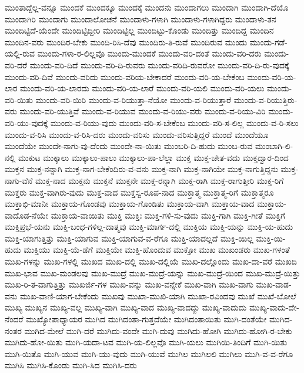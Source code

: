 {ಮುಂತಾದ್ದೆಲ್ಲ-ವನ್ನೂ
ಮುಂದಕೆ
ಮುಂದಕ್ಕೂ
ಮುಂದಕ್ಕೆ
ಮುಂದನು
ಮುಂದಾಗಲು
ಮುಂದಾಗಿ
ಮುಂದಾಗಿ-ದೆಯೊ
ಮುಂದಾಗಿರಿ
ಮುಂದಾಗು
ಮುಂದಾಲೋಚನೆ
ಮುಂದಾಳು-ಗಳಾಗಿ
ಮುಂದಾಳು-ಗಳಾಗಿದ್ದರು
ಮುಂದಾಳು-ತನ
ಮುಂದಿಟ್ಟಿದೆ-ಯೆಂದೇ
ಮುಂದಿಟ್ಟಿದ್ದೀರಿ
ಮುಂದಿಟ್ಟಿಲ್ಲ
ಮುಂದಿಟ್ಟು-ಕೊಂಡು
ಮುಂದಿತ್ತು
ಮುಂದಿದ್ದ
ಮುಂದಿನ
ಮುಂದಿನ-ವರು
ಮುಂದಿರ-ಬೇಕು
ಮುಂದಿ-ರಿಸಿ-ದೆವು
ಮುಂದಿರು-ತಿ-ರುವೆ
ಮುಂದಿರುವ
ಮುಂದು
ಮುಂದು-ಗಡೆ-ಯಲ್ಲಿ-ರುವ
ಮುಂದು-ಗಳಾ-ರ-ಲಿಲ್ಲವೊ
ಮುಂದು-ಮುಂದಕೆ
ಮುಂದು-ವರಿ-ದಂತೆ
ಮುಂದು-ವರಿ-ದರು
ಮುಂದು-ವರಿ-ದರೆ
ಮುಂದು-ವರಿ-ದಿದೆ
ಮುಂದು-ವರಿ-ದಿ-ರುವರು
ಮುಂದು-ವರಿದಿ-ರುವರೋ
ಮುಂದು-ವರಿ-ದಿ-ರು-ವುದಕ್ಕೆ
ಮುಂದು-ವರಿ-ದಿವೆ
ಮುಂದು-ವರಿದು
ಮುಂದು-ವರಿಯ-ಬೇಕಾದರೆ
ಮುಂದು-ವರಿ-ಯ-ಬೇಕೆಂಬ
ಮುಂದು-ವರಿ-ಯ-ಲಾರ
ಮುಂದು-ವರಿ-ಯ-ಲಾರದು
ಮುಂದು-ವರಿ-ಯ-ಲಾರೆ
ಮುಂದು-ವರಿ-ಯಲಿ
ಮುಂದು-ವರಿ-ಯಲು
ಮುಂದು-ವರಿ-ಯಿತು
ಮುಂದು-ವರಿ-ಯಿರಿ
ಮುಂದು-ವ-ರಿಯುತ್ತಾ-ನೆಯೋ
ಮುಂದು-ವ-ರಿಯುತ್ತಾರೆ
ಮುಂದು-ವ-ರಿಯುತ್ತಿರು-ವರು
ಮುಂದು-ವರಿ-ಯುತ್ತಿವೆ
ಮುಂದು-ವ-ರಿಯುವ
ಮುಂದು-ವ-ರಿಯು-ವರು
ಮುಂದು-ವ-ರಿಯು-ವಿರಿ
ಮುಂದು-ವರಿ-ಯು-ವುದಕ್ಕೆ
ಮುಂದು-ವ-ರಿಯು-ವುದು
ಮುಂದು-ವರಿ-ಸ-ಬೇಕೆಂಬ
ಮುಂದು-ವರಿ-ಸ-ಲಿಲ್ಲ
ಮುಂದು-ವ-ರಿ-ಸಲು
ಮುಂದು-ವ-ರಿಸಿ
ಮುಂದು-ವ-ರಿಸಿ-ದರು
ಮುಂದು-ವರಿಸು
ಮುಂದು-ವರಿಸುತ್ತಿದ್ದರೆ
ಮುಂದೆ
ಮುಂದೆಯೂ
ಮುಂದೆಯೇ
ಮುಂದೇ-ನಾಗು-ವು-ದೆಂದು
ಮುಂದೇ-ನಾ-ಯಿತು
ಮುಂಬರಿ-ದಿ-ಹುದು
ಮುಂಬ-ರುವ
ಮುಂಬಾಗಿ-ಲಿ-ನಲ್ಲಿ
ಮುಕುಟ
ಮುಕ್ಕಾಲು
ಮುಕ್ಕಾಲು-ಪಾಲು
ಮುಕ್ಕಾಲು-ಪಾ-ಲೆಲ್ಲಾ
ಮುಕ್ತ
ಮುಕ್ತ-ಚೇತ-ವದು
ಮುಕ್ತದ್ವಾರ-ದಿಂದ
ಮುಕ್ತನ
ಮುಕ್ತ-ನನ್ನಾಗಿ
ಮುಕ್ತ-ನಾಗ-ಬೇಕೆಂದಿರು-ವ-ವನು
ಮುಕ್ತ-ನಾಗಿ
ಮುಕ್ತ-ನಾಗಿಯೇ
ಮುಕ್ತ-ನಾಗುತ್ತಿದ್ದನು
ಮುಕ್ತ-ನಾಗು-ವೆನೆ
ಮುಕ್ತ-ನಾದ
ಮುಕ್ತನು
ಮುಕ್ತನೆ
ಮುಕ್ತನೇ
ಮುಕ್ತ-ರನ್ನಾಗಿ
ಮುಕ್ತ-ರಾಗಿ
ಮುಕ್ತ-ರಾಗುತ್ತೀರಿ
ಮುಕ್ತ-ರಿಗೆ
ಮುಕ್ತರು
ಮುಕ್ತ-ವಾಗಿರು-ವುದು
ಮುಕ್ತ-ವಾದ
ಮುಕ್ತಸ್ವ-ರೂಪ-ನಾದ
ಮುಕ್ತಾತ್ಮ
ಮುಕ್ತಾತ್ಮ-ರಿಗೆ
ಮುಕ್ತಾತ್ಮರೂ
ಮುಕ್ತಾಭಿ-ಮಾನೀ
ಮುಕ್ತಾಯ-ಗೊಂಡವು
ಮುಕ್ತಾಯ-ಗೊಂಡಿತು
ಮುಕ್ತಾಯ-ವಾಗಿ
ಮುಕ್ತಾಯ-ವಾದ
ಮುಕ್ತಾಯ-ವಾದೊಡ-ನೆಯೇ
ಮುಕ್ತಾಯ-ವಾಯಿತು
ಮುಕ್ತಿ
ಮುಕ್ತಿಃ
ಮುಕ್ತಿ-ಗಳಿ-ಸು-ವುದು
ಮುಕ್ತಿ-ಗಾಗಿ
ಮುಕ್ತಿ-ಗೀತೆ
ಮುಕ್ತಿಗೆ
ಮುಕ್ತಿಪ್ರಭೆ-ಯನು
ಮುಕ್ತಿ-ಬಂಧ-ಗಳಿಲ್ಲ-ದಾತ್ಮವು
ಮುಕ್ತಿ-ಮಾರ್ಗ-ದಲ್ಲಿ
ಮುಕ್ತಿಯ
ಮುಕ್ತಿ-ಯನ್ನು
ಮುಕ್ತಿ-ಯ-ಹುದು
ಮುಕ್ತಿ-ಯಾಗುತ್ತಿತ್ತು
ಮುಕ್ತಿ-ಯಾಗುವ
ಮುಕ್ತಿ-ಯಾಗುವ-ವ-ರೆಗೂ
ಮುಕ್ತಿ-ಯಾದಲ್ಲದೆ
ಮುಕ್ತಿ-ಯಿಲ್ಲ
ಮುಕ್ತಿ-ಯಿ-ಹುದು
ಮುಕ್ತಿಯು
ಮುಕ್ತಿ-ಯೆ-ಡೆಗೆ
ಮುಕ್ತಿಯೇ
ಮುಕ್ತಿ-ಹೊಂದುವ
ಮುಕ್ತೋ
ಮುಖ
ಮುಖಂಡರು
ಮುಖ-ಗಳಂತೆ
ಮುಖ-ಗಳನ್ನು
ಮುಖ-ಗಳಲ್ಲಿ
ಮುಖದ
ಮುಖ-ದಲ್ಲಿ
ಮುಖ-ದಲ್ಲಿಯೆ
ಮುಖ-ದಲ್ಲೊಂದು
ಮುಖ-ದಾ-ವರೆ
ಮುಖದಿ
ಮುಖ-ಭಾವ
ಮುಖ-ಮಂಡಲವು
ಮುಖ-ಮುದ್ರೆ
ಮುಖ-ಮುದ್ರೆ-ಯನ್ನು
ಮುಖ-ಮುದ್ರೆ-ಯಿಂದ
ಮುಖ-ಮುದ್ರೆ-ಯಿತ್ತು
ಮುಖ-ರಿ-ತ-ವಾಗುತ್ತಿತ್ತು
ಮುಖರ್ಜಿ-ಗಳ
ಮುಖ-ವನ್ನು
ಮುಖ-ವನ್ನೇಕೆ
ಮುಖ-ವಾಗಿ
ಮುಖ-ವಾಗು
ಮುಖ-ವಾಡ-ವನು
ಮುಖ-ವಾಣಿ-ಯಾಗ-ಬೇಕೆಂದು
ಮುಖವು
ಮುಖಾ-ಮುಖಿ-ಯಾಗಿ
ಮುಖಾ-ರವಿಂದವು
ಮುಖೆ
ಮುಖೆ-ಬೋಲೆ
ಮುಖ್ಯ
ಮುಖ್ಯನ
ಮುಖ್ಯ-ವಲ್ಲ
ಮುಖ್ಯ-ವಾಗಿ
ಮುಖ್ಯ-ವಾದ
ಮುಖ್ಯ-ವಾದದ್ದು
ಮುಖ್ಯ-ವಾದುದು
ಮುಖ್ಯ-ವಾದು-ದೇ-ನೆಂದರೆ
ಮುಖ್ಯೋಪಾಧ್ಯಾಯರ
ಮುಗಿದ
ಮುಗಿದಂತಾ-ಗುತ್ತದೆಯೇ
ಮುಗಿದಂತಾಯಿತು
ಮುಗಿ-ದಂತೆಯೇ
ಮುಗಿದ-ನಂತರ
ಮುಗಿದ-ಮೇಲೆ
ಮುಗಿ-ದರೆ
ಮುಗಿದು-ವಂದೇ
ಮುಗಿ-ದುವು
ಮುಗಿದು-ಹೋಗಿ
ಮುಗಿದು-ಹೋಗಿ-ರ-ಬೇಕು
ಮುಗಿದು-ಹೋ-ಯಿತು
ಮುಗಿ-ಯದಾ-ಟವ
ಮುಗಿ-ಯ-ಲಿಲ್ಲವೊ
ಮುಗಿ-ಯಲು
ಮುಗಿಯಿ-ತಿಂದಿಗೆ
ಮುಗಿ-ಯಿತು
ಮುಗಿ-ಯಿತೊ
ಮುಗಿ-ಯುವ
ಮುಗಿ-ಯು-ವುದು
ಮುಗಿ-ಯುವೆ
ಮುಗಿಲ
ಮುಗಿಲಲಿ
ಮುಗಿಲು
ಮುಗಿ-ವ-ವ-ರೆಗೂ
ಮುಗಿಸಿ
ಮುಗಿಸಿ-ಕೊಂಡು
ಮುಗಿ-ಸಿದ
ಮುಗಿಸಿ-ದರು
}
